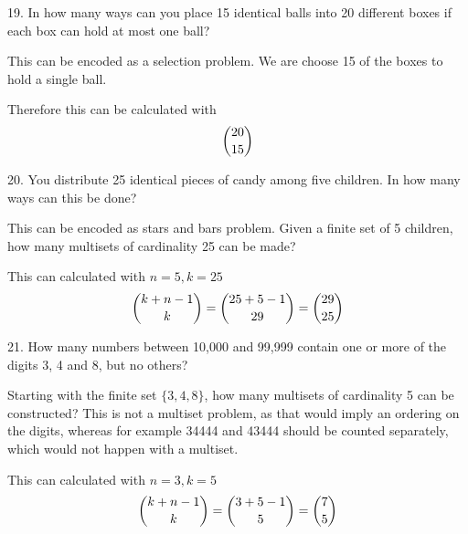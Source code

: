 \documentclass{hippoidC}
\begin{document}
\begin{prooflist}{19. In how many ways can you place 15 identical balls into 20
		different boxes if each box can hold at most one ball?}
	\item This can be encoded as a selection problem. We are choose 15 of the boxes
	to hold a single ball.
	\item Therefore this can be calculated with
	$$ \dbinom{20}{15}$$
\end{prooflist}

\begin{prooflist}{20. You distribute 25 identical pieces of candy among five children. In how many ways can this be done?}
	\item This can be encoded as stars and bars problem. Given a finite set of 5
	children, how many multisets of cardinality 25 can be made?
	\item This can calculated with $n=5, k=25$
	$$ \dbinom{k+n-1}{k} = \dbinom{25+5-1}{29}=\dbinom{29}{25}$$
\end{prooflist}

\begin{prooflist}{21. How many numbers between 10,000 and 99,999 contain one or more of the digits 3, 4 and 8, but no others?}
	\item Starting with the finite set $\{3, 4, 8\}$, how many multisets of
	cardinality 5 can be constructed? This is not a multiset problem, as that
	would imply an ordering on the digits, whereas for example 34444 and 43444
	should be counted separately, which would not happen with a multiset.
	\item This can calculated with $n=3, k=5$
	$$ \dbinom{k+n-1}{k} = \dbinom{3+5-1}{5}=\dbinom{7}{5}$$
\end{prooflist}
\end{document}
